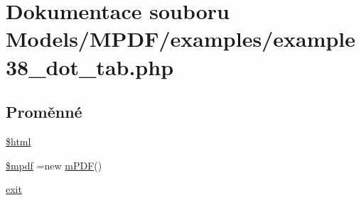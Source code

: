 \hypertarget{example38__dot__tab_8php}{\section{Dokumentace souboru Models/\-M\-P\-D\-F/examples/example38\-\_\-dot\-\_\-tab.php}
\label{example38__dot__tab_8php}
}
\subsection*{Proměnné}
\begin{DoxyCompactItemize}
\item 
\hyperlink{example38__dot__tab_8php_a6f96e7fc92441776c9d1cd3386663b40}{\$html}
\item 
\hyperlink{example38__dot__tab_8php_ad028f81910d6cbab9b184d2214b3a8f8}{\$mpdf} =new \hyperlink{classm_p_d_f}{m\-P\-D\-F}()
\item 
\hyperlink{example38__dot__tab_8php_a6733eb5f605d09eaede9845835d71c4e}{exit}
\end{DoxyCompactItemize}


